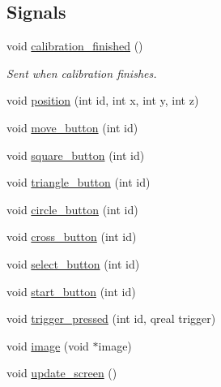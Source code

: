 \subsection*{Signals}
\begin{DoxyCompactItemize}
\item 
\hypertarget{class_p_s_move_controller_thread_a543a12ab5adceea50a94502086563dd1}{void \hyperlink{class_p_s_move_controller_thread_a543a12ab5adceea50a94502086563dd1}{calibration\-\_\-finished} ()}\label{class_p_s_move_controller_thread_a543a12ab5adceea50a94502086563dd1}

\begin{DoxyCompactList}\small\item\em Sent when calibration finishes. \end{DoxyCompactList}\item 
void \hyperlink{class_p_s_move_controller_thread_a9a13410a3629fb6ca5cd119ccccb7c61}{position} (int id, int x, int y, int z)
\item 
void \hyperlink{class_p_s_move_controller_thread_a1b4b710da167b116ca9e986cd3ce3397}{move\-\_\-button} (int id)
\item 
void \hyperlink{class_p_s_move_controller_thread_adba4bb0191944583061b07fd1134ca60}{square\-\_\-button} (int id)
\item 
void \hyperlink{class_p_s_move_controller_thread_a28fa2a3f9460c464f4adeedd7ede23e8}{triangle\-\_\-button} (int id)
\item 
void \hyperlink{class_p_s_move_controller_thread_a3ac1ef9d5418dd5e62a9936312a8d41c}{circle\-\_\-button} (int id)
\item 
void \hyperlink{class_p_s_move_controller_thread_aa86dcf6486804813751d167fece01408}{cross\-\_\-button} (int id)
\item 
void \hyperlink{class_p_s_move_controller_thread_afc48b722755565b9eee295042c749471}{select\-\_\-button} (int id)
\item 
void \hyperlink{class_p_s_move_controller_thread_a6873796724207954595e7bc303f4600d}{start\-\_\-button} (int id)
\item 
void \hyperlink{class_p_s_move_controller_thread_aaa3a2937d023c789c7a0008b1eef67d5}{trigger\-\_\-pressed} (int id, qreal trigger)
\item 
void \hyperlink{class_p_s_move_controller_thread_a16c2e82e2e4ac257dcd08acd29786590}{image} (void $\ast$image)
\item 
void \hyperlink{class_p_s_move_controller_thread_ac72baf21165fa2d16e2fa471d07184e2}{update\-\_\-screen} ()
\end{DoxyCompactItemize}
